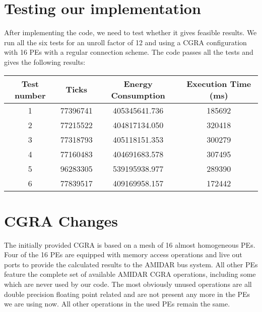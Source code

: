 		\section{Testing our implementation} %
	\label{sec:test_impl}
		After implementing the code, we need to test whether it gives feasible results. We run all the six tests for an unroll factor of 12 and using a CGRA configuration with 16 PEs with a regular connection scheme. The code passes all the tests and gives the following results:
		\begin{center}
			\begin{tabular}{||c | c c c ||} 
			\hline
			Test number & Ticks & Energy Consumption & Execution Time (ms)\\ [0.5ex] 
			\hline\hline
			1 & 77396741 & 405345641.736 & 185692 \\
			\hline
			2 & 77215522 & 404817134.050 & 320418 \\
			\hline
			3 & 77318793 & 405118151.353 & 300279 \\
			\hline
			4 & 77160483 & 404691683.578 & 307495 \\
			\hline
			5 & 96283305 & 539195938.977 & 289390 \\  
			\hline
			6 & 77839517 & 409169958.157 & 172442 \\  
			\hline
			\end{tabular}
		\end{center}
		

	\section{CGRA Changes} %
	\label{sec:cgra_changes}
		The initially provided CGRA is based on a mesh of \num{16} almost homogeneous PEs. Four of the \num{16} PEs are equipped with memory access operations and live out ports to provide the calculated results to the AMIDAR bus system. All other PEs feature the complete set of available AMIDAR CGRA operations, including some which are never used by our code. The most obviously unused operations are all double precision floating point related and are not present any more in the PEs we are using now. All other operations in the used PEs remain the same.\newline
		
